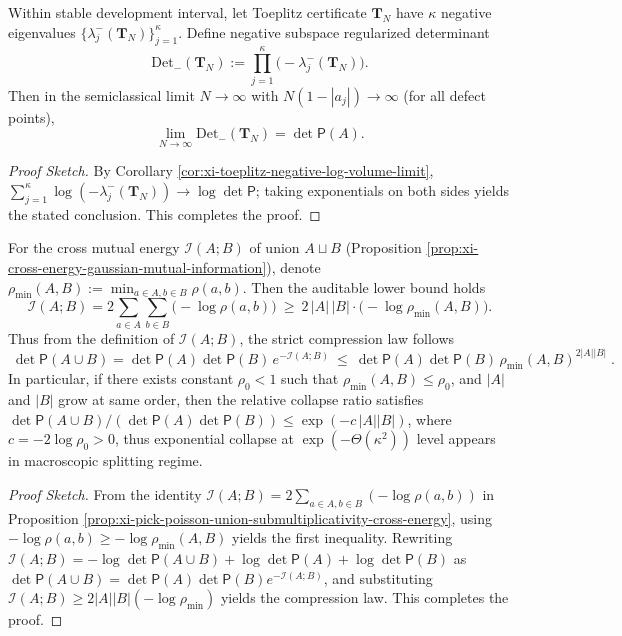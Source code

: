 \begin{corollary}\label{cor:xi-toeplitz-negative-regularized-determinant-limit}
Within stable development interval, let Toeplitz certificate \(\mathbf{T}_N\) have \(\kappa\) negative eigenvalues \(\{\lambda_j^{-}(\mathbf{T}_N)\}_{j=1}^{\kappa}\).
Define negative subspace regularized determinant
\[
\mathrm{Det}_{-}(\mathbf{T}_N):=\prod_{j=1}^{\kappa}\bigl(-\lambda_j^{-}(\mathbf{T}_N)\bigr).
\]
Then in the semiclassical limit \(N\to\infty\) with \(N(1-|a_j|)\to\infty\) (for all defect points),
\[
\boxed{\;
\lim_{N\to\infty}\mathrm{Det}_{-}(\mathbf{T}_N)=\det\mathsf P(A).\;}
\]
\end{corollary}
\begin{proof}[Proof Sketch]
By Corollary \ref{cor:xi-toeplitz-negative-log-volume-limit},
\(\sum_{j=1}^{\kappa}\log(-\lambda_j^{-}(\mathbf{T}_N))\to \log\det\mathsf P\);
taking exponentials on both sides yields the stated conclusion. This completes the proof.
\end{proof}

\begin{corollary}\label{cor:xi-cross-energy-lower-bound-by-min-separation}
For the cross mutual energy \(\mathcal I(A;B)\) of union \(A\sqcup B\) (Proposition \ref{prop:xi-cross-energy-gaussian-mutual-information}), denote
\(
\rho_{\min}(A,B):=\min_{a\in A,b\in B}\rho(a,b)
\).
Then the auditable lower bound holds
\[
\boxed{\;
\mathcal I(A;B)
=2\sum_{a\in A}\sum_{b\in B}\bigl(-\log\rho(a,b)\bigr)
\ \ge\
2\,|A|\,|B|\cdot\bigl(-\log\rho_{\min}(A,B)\bigr).\;}
\]
Thus from the definition of \(\mathcal I(A;B)\), the strict compression law follows
\[
\boxed{\;
\det\mathsf P(A\cup B)
=\det\mathsf P(A)\det\mathsf P(B)\,e^{-\mathcal I(A;B)}
\ \le\
\det\mathsf P(A)\det\mathsf P(B)\,\rho_{\min}(A,B)^{2|A||B|}\; }.
\]
In particular, if there exists constant \(\rho_0<1\) such that \(\rho_{\min}(A,B)\le \rho_0\), and \(|A|\) and \(|B|\) grow at same order, then the relative collapse ratio satisfies
\(
\det\mathsf P(A\cup B)\big/(\det\mathsf P(A)\det\mathsf P(B))
\le \exp(-c\,|A||B|)
\),
where \(c=-2\log\rho_0>0\), thus exponential collapse at \(\exp(-\Theta(\kappa^2))\) level appears in macroscopic splitting regime.
\end{corollary}
\begin{proof}[Proof Sketch]
From the identity \(\mathcal I(A;B)=2\sum_{a\in A,b\in B}(-\log\rho(a,b))\) in Proposition \ref{prop:xi-pick-poisson-union-submultiplicativity-cross-energy}, using
\(-\log\rho(a,b)\ge -\log\rho_{\min}(A,B)\) yields the first inequality.
Rewriting \(\mathcal I(A;B)=-\log\det\mathsf P(A\cup B)+\log\det\mathsf P(A)+\log\det\mathsf P(B)\) as
\(
\det\mathsf P(A\cup B)=\det\mathsf P(A)\det\mathsf P(B)e^{-\mathcal I(A;B)}
\),
and substituting \(\mathcal I(A;B)\ge 2|A||B|(-\log\rho_{\min})\) yields the compression law. This completes the proof.
\end{proof}

